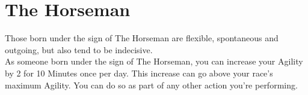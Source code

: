 \section{The Horseman}\label{zodiac:horseman}

Those born under the sign of The Horseman are flexible, spontaneous and outgoing, but also tend to be indecisive.\\
As someone born under the sign of The Horseman, you can increase your Agility by 2 for 10 Minutes once per day.
This increase can go above your race's maximum Agility.
You can do so as part of any other action you're performing.\\